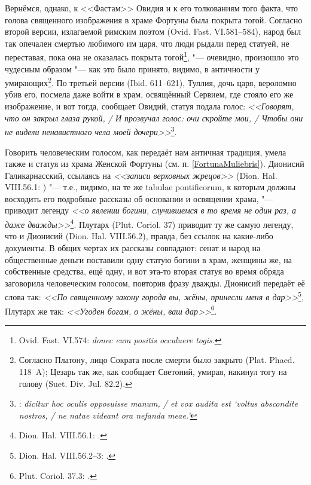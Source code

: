 Вернёмся, однако, к <<Фастам>> Овидия и к его толкованиям того факта, что голова священного изображения в храме Фортуны была покрыта тогой. Согласно второй версии, излагаемой римским поэтом (Ovid. Fast. VI.581--584), народ был так опечален смертью любимого им царя, что люди рыдали перед статуей, не переставая, пока она не оказалась покрыта тогой\footnote{Ovid. Fast. VI.574: \textit{donec eum positis occuluere togis}.}, "--- очевидно, произошло это чудесным образом "--- как это было принято, видимо, в античности у умирающих\footnote{Согласно Платону, лицо Сократа после смерти было закрыто (Plat. Phaed. 118~A); Цезарь так же, как сообщает Светоний, умирая, накинул тогу на голову (Suet. Div. Jul. 82.2).}. По третьей версии (Ibid. 611--621), Туллия, дочь царя, вероломно убив его, посмела даже войти в храм, освящённый Сервием, где стояло его же изображение, и вот тогда, сообщает Овидий, статуя подала голос:  \textit{<<Говорят, что он закрыл глаза рукой, / И прозвучал голос: очи скройте мои, / Чтобы они не видели ненавистного чела моей дочери>>}\footnote{: \textit{dicitur hoc oculis opposuisse manum, / et vox audita est `voltus abscondite nostros, / ne natae videant ora nefanda meae.'}}.

Говорить человеческим голосом, как передаёт нам античная традиция, умела также и статуя из храма Женской Фортуны (см. п. \ref{FortunaMuliebris}). Дионисий Галикарнасский, ссылаясь на \textit{<<записи верховных жрецов>>} (Dion. Hal. VIII.56.1: ) "--- т.е., видимо, на те же tabulae pontificorum, к которым должны восходить его подробные рассказы об основании и освящении храма, "--- приводит легенду \textit{<<о явлении богини, случившемся в то время не один раз, а даже дважды>>}\footnote{Dion. Hal. VIII.56.1: .}. Плутарх (Plut. Coriol. 37) приводит ту же самую легенду, что и Дионисий (Dion. Hal. VIII.56.2), правда, без ссылок на какие-либо документы. В общих чертах их рассказы совпадают: сенат и народ на общественные деньги поставили одну статую богини в храм, женщины же, на собственные средства, ещё одну, и вот эта-то вторая статуя во время обряда заговорила человеческим голосом, повторив фразу дважды. Дионисий передаёт её слова так: \textit{<<По священному закону города вы, жёны, принесли меня в дар>>}\footnote{Dion. Hal. VIII.56.2--3: .}, Плутарх же так: \textit{<<Угоден богам, о жёны, ваш дар>>}\footnote{Plut. Coriol. 37.3: .}. 


